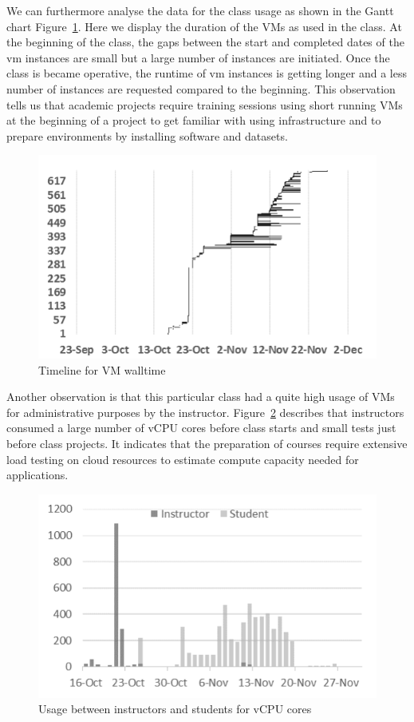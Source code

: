 \documentclass{sig-alternate-05-2015}
\begin{document}
We can furthermore analyse the data for the class usage as shown in the Gantt chart Figure~\ref{F:fig4}. Here we display the duration of the VMs as used in the class. At the beginning of the class, the gaps between the start and completed dates of the vm instances are small but a large number of instances are initiated. Once the class is became operative, the runtime of vm instances is getting longer and a less number of instances are requested compared to the beginning. This observation tells us that academic projects require training sessions using short running VMs at the beginning of a project to get familiar with using infrastructure and to prepare environments by installing software and datasets.

\begin{figure}[htb] 
  \centering 
    \includegraphics[width=1.0\columnwidth]{images/fig3.pdf} 
  \caption{Timeline for VM walltime}\label{F:fig4} 
\end{figure} 

Another observation is that this particular class had a quite high usage of VMs for administrative purposes by the instructor. Figure~\ref{F:fig5} describes that instructors consumed a large number of vCPU cores before class starts and small tests just before class projects. It indicates that the preparation of courses require extensive load testing on cloud resources to estimate compute capacity needed for applications.

\begin{figure}[htb] 
  \centering 
    \includegraphics[width=1.0\columnwidth]{images/fig4.pdf} 
  \caption{Usage between instructors and students for vCPU cores}\label{F:fig5} 
\end{figure} 
\end{document}
